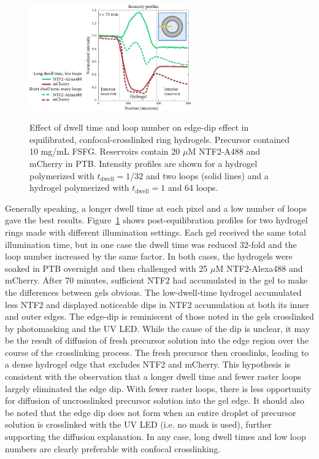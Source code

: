 \begin{figure} %
\caption[Effect of dwell time and loop number on confocal-crosslinked hydrogels.]{Effect of dwell time and loop number on edge-dip effect in equilibrated, confocal-crosslinked ring hydrogels.  Precursor contained 10 mg/mL FSFG.  Reservoirs contain 20 $\mu$M NTF2-A488 and mCherry in PTB.  Intensity profiles are shown for a hydrogel polymerized with $t_\mathrm{dwell} = 1/32$ and two loops (solid lines) and a hydrogel polymerized with $t_\mathrm{dwell} = 1$ and 64 loops.}
\centering
\includegraphics[width=0.62\textwidth]{figs/ch03/dwell-time-effect}
\label{fig:dwell-time-effect}
\end{figure} %

Generally speaking, a longer dwell time at each pixel and a low number of loops gave the best results.  %
 Figure~\ref{fig:dwell-time-effect} shows post-equilibration profiles for two hydrogel rings made with different illumination settings.  Each gel received the same total illumination time, but in one case the dwell time was reduced 32-fold and the loop number increased by the same factor.  In both cases, the hydrogels were soaked in PTB overnight and then challenged with 25 $\mu$M NTF2-Alexa488 and mCherry.  After 70 minutes, sufficient NTF2 had accumulated in the gel to make the differences between gels obvious.  The low-dwell-time hydrogel accumulated less NTF2 and displayed noticeable dips in NTF2 accumulation at both its inner and outer edges.  The edge-dip is reminiscent of those noted in the gels crosslinked by photomasking and the UV LED.  While the cause of the dip is unclear, it may be the result of diffusion of fresh precursor solution into the edge region over the course of the crosslinking process.  The fresh precursor then crosslinks, leading to a dense hydrogel edge that excludes NTF2 and mCherry.  This hypothesis is consistent with the observation that a longer dwell time and fewer raster loops largely eliminated the edge dip.  With fewer raster loops, there is less opportunity for diffusion of uncrosslinked precursor solution into the gel edge.  It should also be noted that the edge dip does not form when an entire droplet of precursor solution is crosslinked with the UV LED (i.e. no mask is used), further supporting the diffusion explanation.  In any case, long dwell times and low loop numbers are clearly preferable with confocal crosslinking.

